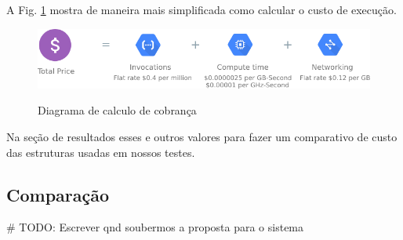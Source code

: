 A Fig. \ref{fig:google-cloud-functions-pricing} mostra de maneira mais simplificada como calcular o custo de execução.

\begin{figure}[ht]
	\centering
	\caption{Diagrama de calculo de cobrança}

	\includegraphics[width=12.5cm]{figuras/google-cloud-functions/pricing.png}
	\label{fig:google-cloud-functions-pricing}
\end{figure}

Na seção de resultados esses e outros valores para fazer um comparativo de custo das estruturas usadas em nossos testes.

\subsection{Comparação}
# TODO: Escrever qnd soubermos a proposta para o sistema
